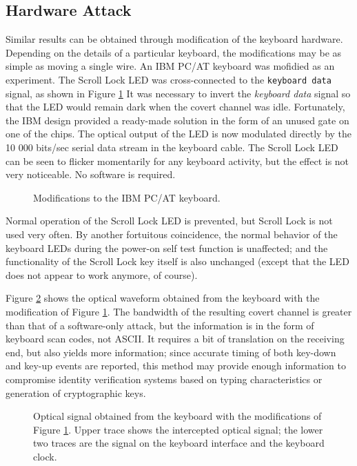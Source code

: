 \documentclass[twocolumn]{article}
\begin{document}
{\subsection{Hardware Attack}

Similar results can be obtained through modification of the keyboard hardware.  Depending on the details of a particular keyboard, the modifications may be as simple as moving a single wire.  An IBM PC/AT keyboard was mofidied as an experiment.  The Scroll Lock LED was cross-connected to the {\tt keyboard data} signal, as shown in Figure \ref{keyboard_cross_connect_figure}  It was necessary to invert the {\it keyboard data} signal so that the LED would remain dark when the covert channel was idle.  Fortunately, the IBM design provided a ready-made solution in the form of an unused gate on one of the chips.  The optical output of the LED is now modulated directly by the 10 000 bits/sec serial data stream in the keyboard cable.  The Scroll Lock LED can be seen to flicker momentarily for any keyboard activity, but the effect is not very noticeable.  No software is required.

\begin{figure}[htbp]
\centerline{\epsfysize=1.5in }
\caption{Modifications to the IBM PC/AT keyboard.}
\label{keyboard_cross_connect_figure}
\end{figure}

Normal operation of the Scroll Lock LED is prevented, but Scroll Lock is not used very often.  By another fortuitous coincidence, the normal behavior of the keyboard LEDs during the power-on self test function is unaffected; and the functionality of the Scroll Lock key itself is also unchanged (except that the LED does not appear to work anymore, of course).

Figure \ref{keyboard_intercept_figure} shows the optical waveform obtained from the keyboard with the modification of Figure \ref{keyboard_cross_connect_figure}.  The bandwidth of the resulting covert channel is greater than that of a software-only attack, but the information is in the form of keyboard scan codes, not ASCII.  It requires a bit of translation on the receiving end, but also yields more information; since accurate timing of both key-down and key-up events are reported, this method may provide enough information to compromise identity verification systems based on typing characteristics or generation of cryptographic keys. \cite{umphress_and_williams, pgp}

\begin{figure}[htbp]
\centerline{\epsfysize=1.5in }
\caption{Optical signal obtained from the keyboard with the modifications of Figure \ref{keyboard_cross_connect_figure}.  Upper trace shows the intercepted optical signal; the lower two traces are the signal on the keyboard interface and the keyboard clock.}
\label{keyboard_intercept_figure}
\end{figure}

}
\end{document}
